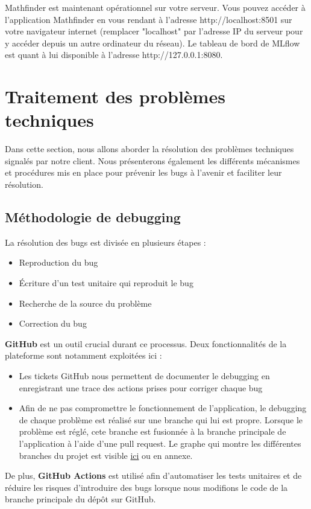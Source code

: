 \documentclass[french]{article}
\begin{document}
    Mathfinder est maintenant opérationnel sur votre serveur. Vous pouvez accéder à l'application Mathfinder en vous rendant à l'adresse http://localhost:8501 sur votre navigateur internet (remplacer "localhost" par l'adresse IP du serveur pour y accéder depuis un autre ordinateur du réseau). Le tableau de bord de MLflow est quant à lui disponible à l'adresse http://127.0.0.1:8080.


    \section{Traitement des problèmes techniques}
    Dans cette section, nous allons aborder la résolution des problèmes techniques signalés par notre client. Nous présenterons également les différents mécanismes et procédures mis en place pour prévenir les bugs à l'avenir et faciliter leur résolution.
    \subsection{Méthodologie de debugging}
    La résolution des bugs est divisée en plusieurs étapes :
    \begin{itemize}
        \item Reproduction du bug
        \item Écriture d'un test unitaire qui reproduit le bug
        \item Recherche de la source du problème
        \item Correction du bug
    \end{itemize}
    \textbf{GitHub} est un outil crucial durant ce processus. Deux fonctionnalités de la plateforme sont notamment exploitées ici :
    \begin{itemize}
        \item Les tickets GitHub nous permettent de documenter le debugging en enregistrant une trace des actions prises pour corriger chaque bug
        \item Afin de ne pas compromettre le fonctionnement de l'application, le debugging de chaque problème est réalisé sur une branche qui lui est propre. Lorsque le problème est réglé, cete branche est fusionnée à la branche principale de l'application à l'aide d'une pull request. Le graphe qui montre les différentes branches du projet est visible \href{https://github.com/vinpap/mathfinder/network}{ici} ou en annexe.
    \end{itemize}
    De plus, \textbf{GitHub Actions} est utilisé afin d'automatiser les tests unitaires et de réduire les risques d'introduire des bugs lorsque nous modifions le code de la branche principale du dépôt sur GitHub.
\end{document}
